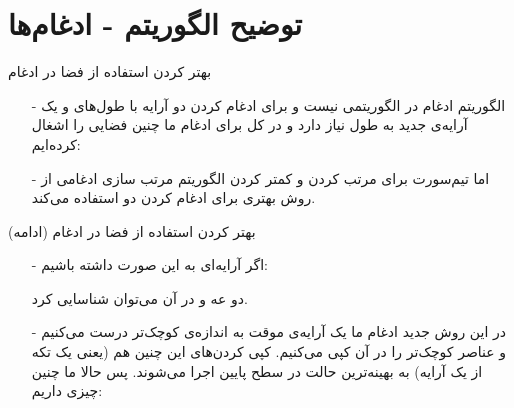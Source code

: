\section{توضیح الگوریتم - ادغام‌ها}
\begin{frame}{بهتر کردن استفاده از فضا در ادغام}
\begin{itemize}\itemr
\item[-]
الگوریتم ادغام در  الگوریتمی  نیست و برای ادغام کردن دو آرایه با طول‌های
و
یک آرایه‌ی جدید به طول
نیاز دارد و در کل برای ادغام ما چنین فضایی را اشغال کرده‌ایم:
\begin{flushleft}
\end{flushleft}

\item[-]
اما تیم‌سورت برای  مرتب کردن و کمتر کردن 
الگوریتم مرتب سازی ادغامی از روش بهتری برای ادغام کردن دو  استفاده می‌کند.
\end{itemize}
\end{frame}

\begin{frame}{بهتر کردن استفاده از فضا در ادغام (ادامه)}
\begin{itemize}\itemr
\item[-]
اگر آرایه‌ای به این صورت داشته باشیم:
\begin{lfl}
\end{lfl}
دو  عه 
و
در آن می‌توان شناسایی کرد.

\item[-]
در این روش جدید ادغام ما یک آرایه‌ی موقت به اندازه‌ی  کوچک‌تر درست می‌کنیم و عناصر  کوچک‌تر را در آن کپی می‌کنیم. کپی کردن‌های این چنین هم (یعنی یک تکه از یک آرایه) به بهینه‌ترین حالت در سطح پایین اجرا می‌شوند. پس حالا ما چنین چیزی داریم:

\begin{lfl}
\\
\end{lfl}
\end{itemize}
\end{frame}

